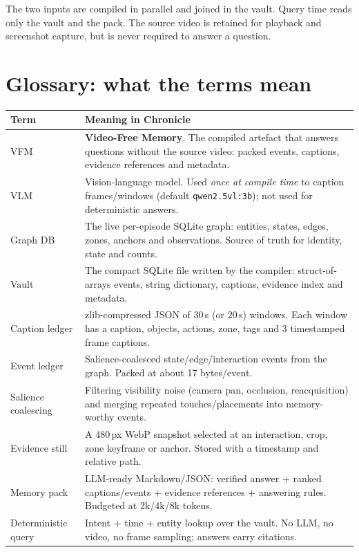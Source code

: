 \documentclass[10pt,a4paper]{article}
\newcommand{\code}[1]{\texttt{\small #1}}
\begin{document}
\noindent
The two inputs are compiled in parallel and joined in the vault. Query time reads only the vault
and the pack. The source video is retained for playback and screenshot capture, but is never
required to answer a question.


\section{Glossary: what the terms mean}

\begin{center}
\small
\begin{tabularx}{\linewidth}{@{}l X@{}}
\toprule
\textbf{Term} & \textbf{Meaning in Chronicle} \\
\midrule
VFM & \textbf{Video-Free Memory}. The compiled artefact that answers questions without the source video: packed events, captions, evidence references and metadata. \\
VLM & Vision-language model. Used \emph{once at compile time} to caption frames/windows (default \code{qwen2.5vl:3b}); not used for deterministic answers. \\
Graph DB & The live per-episode SQLite graph: entities, states, edges, zones, anchors and observations. Source of truth for identity, state and counts. \\
Vault & The compact SQLite file written by the compiler: struct-of-arrays events, string dictionary, captions, evidence index and metadata. \\
Caption ledger & zlib-compressed JSON of 30\,s (or 20\,s) windows. Each window has a caption, objects, actions, zone, tags and 3 timestamped frame captions. \\
Event ledger & Salience-coalesced state/edge/interaction events from the graph. Packed at about 17 bytes/event. \\
Salience coalescing & Filtering visibility noise (camera pan, occlusion, reacquisition) and merging repeated touches/placements into memory-worthy events. \\
Evidence still & A 480\,px WebP snapshot selected at an interaction, crop, zone keyframe or anchor. Stored with a timestamp and relative path. \\
Memory pack & LLM-ready Markdown/JSON: verified answer + ranked captions/events + evidence references + answering rules. Budgeted at 2k/4k/8k tokens. \\
Deterministic query & Intent + time + entity lookup over the vault. No LLM, no video, no frame sampling; answers carry citations. \\

\end{tabularx}
\end{center}
\end{document}
